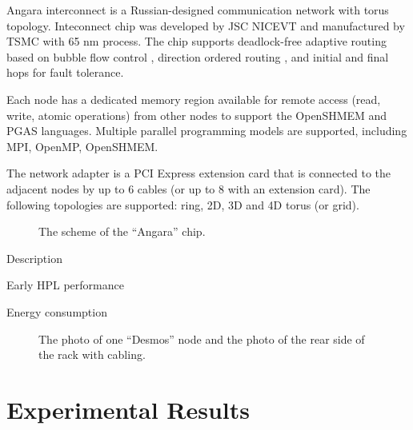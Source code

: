 \documentclass{llncs}
\begin{document}
Angara interconnect is a Russian-designed communication network with torus topology. Inteconnect chip was developed by JSC NICEVT and manufactured by TSMC with 65 nm process. The chip supports deadlock-free adaptive routing based on bubble flow control \cite{Puente:1999:ABR:850940.852882},  direction ordered routing \cite{Adiga:2005:BGT:1665957.1665963}, \cite{Scott96thecray} and initial and final hops \cite{Scott96thecray} for fault tolerance.

Each node has a dedicated memory region available for remote access (read, write, atomic operations) from other nodes to support the OpenSHMEM and PGAS languages. Multiple parallel programming models are supported, including MPI, OpenMP, OpenSHMEM.

The network adapter is a PCI Express extension card that is connected to the adjacent nodes by up to 6 cables (or up to 8 with an extension card). The following topologies are supported: ring, 2D, 3D and 4D torus (or grid). 


\begin{figure}
\centering
\caption{The scheme of the ``Angara'' chip.}
\end{figure}







Description

Early HPL performance

Energy consumption

\begin{figure}[h]
\centering
\caption{The photo of one ``Desmos'' node and the photo of the rear side of the rack with cabling.}
\end{figure}



\section{Experimental Results}
\end{document}
